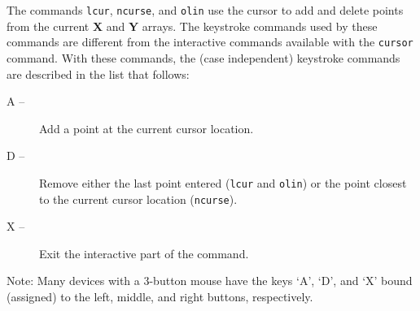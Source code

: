 The commands {\tt lcur}, {\tt ncurse}, and {\tt olin} use the cursor to
add and delete points from the current {\bf X} and {\bf Y} arrays.
The keystroke commands used by these commands are different from the 
interactive commands available with the
{\tt cursor} command.
With these commands, the (case independent) keystroke commands are
described in the list that follows:
\begin{description}
  \item [{A --}] Add a point at the current cursor location.
\samepage
  \item [{D --}] Remove either the last point entered ({\tt lcur}
    and {\tt olin}) or the point closest to the current cursor
    location ({\tt ncurse}).
  \item [{X --}] Exit the interactive part of the command.
\end{description}
{\sc Note}: Many devices with a 3-button mouse have the keys
`A', `D', and `X' bound (assigned) to the left, middle,
and right buttons, respectively.
